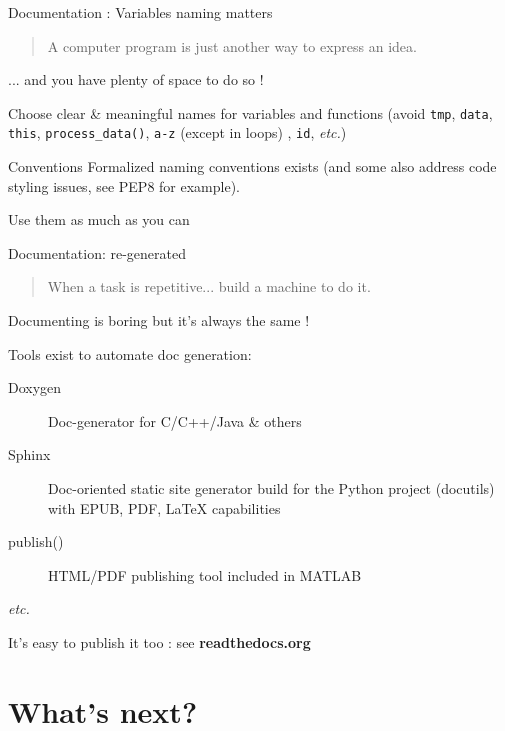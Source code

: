 \documentclass[10pt]{beamer}
\begin{document}
\begin{frame}{Documentation : Variables naming matters} %

  \begin{quotation}
    \noindent A computer program is just another way to express an idea.
  \end{quotation}

  ... and you have plenty of space to do so !

  \pause
  \medskip

  Choose clear \& meaningful names for variables and functions  (avoid \texttt{tmp}, \texttt{data}, \texttt{this},
  \texttt{process\_data()}, \texttt{a-z} (except in loops) , \texttt{id}, \textit{etc.})

  \pause
  \medskip

  \begin{block}{Conventions}
    Formalized naming conventions exists (and some also address code styling issues, see
    PEP8 for example).

    Use them as much as you can
  \end{block}

\end{frame}

\begin{frame}{Documentation: re-generated}

  \begin{quotation}
    When a task is repetitive... build a machine to do it.
  \end{quotation}

  Documenting is boring but it's always the same !

  Tools exist to automate doc generation:

  \begin{description}
  \item[Doxygen] Doc-generator for C/C++/Java \& others
  \item[Sphinx] Doc-oriented static site generator build for the Python project (docutils) with EPUB, PDF, \LaTeX{} capabilities
  \item[publish()] HTML/PDF publishing tool included in MATLAB
  \item[\textit{etc.}]
  \end{description}

  It's easy to publish it too : see \textbf{readthedocs.org}
\end{frame}

\section{What's next?} %
\end{document}
